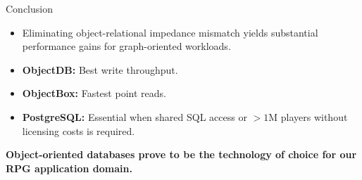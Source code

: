\documentclass{beamer}
\begin{document}
\begin{frame}{Conclusion}
    \begin{itemize}
        \item Eliminating object-relational impedance mismatch yields
            substantial performance gains for graph-oriented workloads.
        \item \textbf{ObjectDB:} Best write throughput.
        \item \textbf{ObjectBox:} Fastest point reads.
        \item \textbf{PostgreSQL:} Essential when shared SQL access or $>1\text{M}$ players without licensing costs is required.
    \end{itemize}
    \vspace{1em}
    \begin{center}
        \textbf{Object-oriented databases prove to be the technology of
        choice for our RPG application domain.}
    \end{center}
\end{frame}
\end{document}
